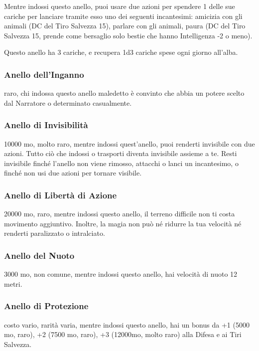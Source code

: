 \begin{multicols}{2}
Mentre indossi questo anello, puoi usare due azioni per spendere 1 delle sue cariche per lanciare tramite esso uno dei seguenti incantesimi: amicizia con gli animali (DC del Tiro Salvezza 15), parlare con gli animali, paura (DC del Tiro Salvezza 15, prende come bersaglio solo bestie che hanno Intelligenza -2 o meno).

Questo anello ha 3 cariche, e recupera 1d3 cariche spese ogni giorno all'alba.

\subsubsection*{Anello dell’Inganno}
raro, chi indossa questo anello maledetto è convinto che abbia un potere scelto dal Narratore o determinato casualmente.

\subsubsection*{Anello di Invisibilità}
10000 mo, molto raro, mentre indossi quest'anello, puoi renderti invisibile con due azioni. Tutto ciò che indossi o trasporti diventa invisibile assieme a te. Resti invisibile finché l'anello non viene rimosso, attacchi o lanci un incantesimo, o finché non usi due azioni per tornare visibile.

\subsubsection*{Anello di Libertà di Azione}
20000 mo, raro, mentre indossi questo anello, il terreno difficile non ti costa movimento aggiuntivo. Inoltre, la magia non può né ridurre la tua velocità né renderti paralizzato o intralciato.

\subsubsection*{Anello del Nuoto}
3000 mo, non comune, mentre indossi questo anello, hai velocità di nuoto 12 metri.

\subsubsection*{Anello di Protezione}
costo vario, rarità varia, mentre indossi questo anello, hai un bonus da +1 (5000 mo, raro), +2 (7500 mo, raro), +3 (12000mo, molto raro) alla Difesa e ai Tiri Salvezza.


\end{multicols}
